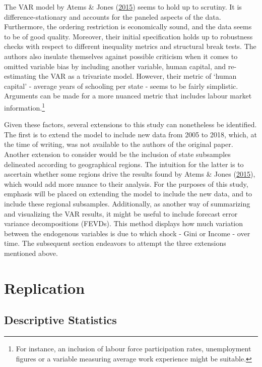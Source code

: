 \documentclass[11pt,preprint, authoryear]{elsarticle}
\numberwithin{equation}{section}
\numberwithin{figure}{section}
\numberwithin{table}{section}
\let\rmarkdownfootnote\footnote%
\def\footnote{\protect\rmarkdownfootnote}
\begin{document}
The VAR model by Atems \& Jones (\protect\hyperlink{ref-atems}{2015})
seems to hold up to scrutiny. It is difference-stationary and accounts
for the paneled aspects of the data. Furthermore, the ordering
restriction is economically sound, and the data seems to be of good
quality. Moreover, their initial specification holds up to robustness
checks with respect to different inequality metrics and structural break
tests. The authors also insulate themselves against possible criticism
when it comes to omitted variable bias by including another variable,
human capital, and re-estimating the VAR as a trivariate model. However,
their metric of `human capital' - average years of schooling per state -
seems to be fairly simplistic. Arguments can be made for a more nuanced
metric that includes labour market information.\footnote{For instance,
  an inclusion of labour force participation rates, unemployment figures
  or a variable measuring average work experience might be suitable.}

Given these factors, several extensions to this study can nonetheless be
identified. The first is to extend the model to include new data from
2005 to 2018, which, at the time of writing, was not available to the
authors of the original paper. Another extension to consider would be
the inclusion of state subsamples delineated according to geographical
regions. The intuition for the latter is to ascertain whether some
regions drive the results found by Atems \& Jones
(\protect\hyperlink{ref-atems}{2015}), which would add more nuance to
their analysis. For the purposes of this study, emphasis will be placed
on extending the model to include the new data, and to include these
regional subsamples. Additionally, as another way of summarizing and
visualizing the VAR results, it might be useful to include forecast
error variance decompositions (FEVDs). This method displays how much
variation between the endogenous variables is due to which shock - Gini
or Income - over time. The subsequent section endeavors to attempt the
three extensions mentioned above.

\newpage

\hypertarget{replication}{%
\section{\texorpdfstring{Replication
\label{Section 3}}{Replication }}\label{replication}}

\hypertarget{descriptive-statistics}{%
\subsection{\texorpdfstring{Descriptive Statistics
\label{Section 3.1}}{Descriptive Statistics }}\label{descriptive-statistics}}
\end{document}
